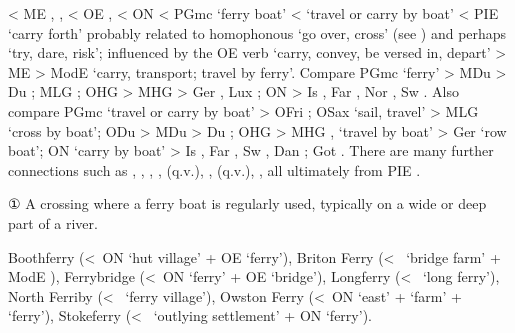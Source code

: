 \documentclass[12pt,letterpaper,oneside,article,draft]{memoir}
\begin{document}
\begin{Lemma}
\begin{Etymology}
	< ME , ,  < OE ,  < ON 
		< PGmc  ‘ferry boat’ <  ‘travel or carry by boat’
		< PIE  ‘carry forth’
		probably related to homophonous  ‘go over, cross’ (see )
		and perhaps  ‘try, dare, risk’;
		influenced by the OE verb  ‘carry, convey, be versed in, depart’
		> ME  > ModE  ‘carry, transport; travel by ferry’.
	Compare
	PGmc  ‘ferry’ >
		MDu  > Du ;
		MLG ;
		OHG  > MHG  > Ger , Lux ;
		ON  > Is , Far , Nor , Sw .
	Also compare
	PGmc  ‘travel or carry by boat’ >
		OFri ;
		OSax  ‘sail, travel’ > MLG  ‘cross by boat’;
		ODu  > MDu  > Du ;
		OHG  > MHG ,  ‘travel by boat’ > Ger  ‘row boat’;
		ON  ‘carry by boat’ > Is , Far , Sw , Dan ;
		Got  .
	There are many further connections such as , , , ,  (q.v.), ,
		 (q.v.), ,  all ultimately from PIE . 
\end{Etymology}
\begin{Definitions}
	① A crossing where a ferry boat is regularly used, typically on a wide or deep part of a river.
\end{Definitions}
\begin{Examples}
	Boothferry (<~ON  ‘hut village’ + OE  ‘ferry’),
	Briton Ferry (<~ ‘bridge farm’ + ModE ),
	Ferrybridge (<~ON  ‘ferry’ + OE  ‘bridge’),
	Longferry (<~ ‘long ferry’),
	North Ferriby (<~ ‘ferry village’),
	Owston Ferry (<~ON  ‘east’ +  ‘farm’ +  ‘ferry’),
	Stokeferry (<~ ‘outlying settlement’ + ON  ‘ferry’).
\end{Examples}
\end{Lemma}

\end{document}

